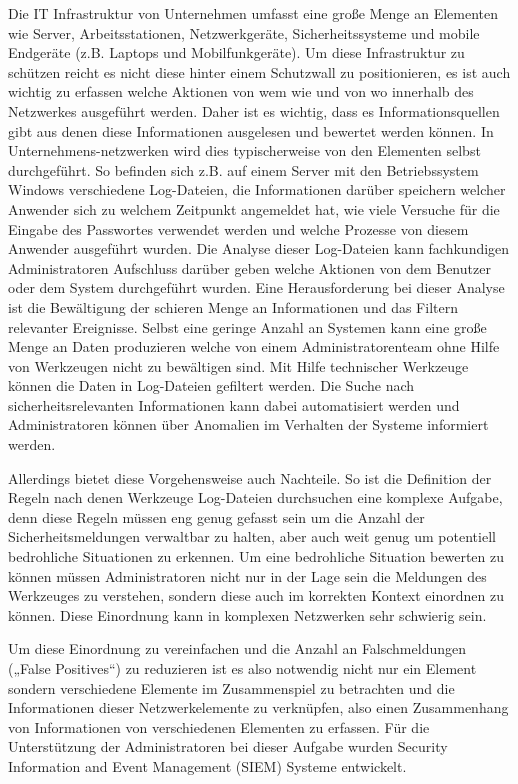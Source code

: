 Die IT Infrastruktur von Unternehmen umfasst eine große Menge an Elementen wie Server, Arbeitsstationen, Netzwerkgeräte, Sicherheitssysteme und mobile Endgeräte (z.B. Laptops und Mobilfunkgeräte). Um diese Infrastruktur zu schützen reicht es nicht diese hinter einem Schutzwall zu positionieren, es ist auch wichtig zu erfassen welche Aktionen von wem wie und von wo innerhalb des Netzwerkes ausgeführt werden. Daher ist es wichtig, dass es Informationsquellen gibt aus denen diese Informationen ausgelesen und bewertet werden können. In Unternehmens-netzwerken wird dies typischerweise von den Elementen selbst durchgeführt. So befinden sich z.B. auf einem Server mit den Betriebssystem Windows verschiedene Log-Dateien, die Informationen darüber speichern welcher Anwender sich zu welchem Zeitpunkt angemeldet hat, wie viele Versuche für die Eingabe des Passwortes verwendet werden und welche Prozesse von diesem Anwender ausgeführt wurden. 
Die Analyse dieser Log-Dateien kann fachkundigen Administratoren Aufschluss darüber geben welche Aktionen von dem Benutzer oder dem System durchgeführt wurden. Eine Herausforderung bei dieser Analyse ist die Bewältigung der schieren Menge an Informationen und das Filtern relevanter Ereignisse. Selbst eine geringe Anzahl an Systemen kann eine große Menge an Daten produzieren welche von einem Administratorenteam ohne Hilfe von Werkzeugen nicht zu bewältigen sind. Mit Hilfe technischer Werkzeuge können die Daten in Log-Dateien gefiltert werden. Die Suche nach sicherheitsrelevanten Informationen kann dabei automatisiert werden und Administratoren können über Anomalien im Verhalten der Systeme informiert werden. 

Allerdings bietet diese Vorgehensweise auch Nachteile. So ist die Definition der Regeln nach denen Werkzeuge Log-Dateien durchsuchen eine komplexe Aufgabe, denn diese Regeln müssen eng genug gefasst sein um die Anzahl der Sicherheitsmeldungen verwaltbar zu halten, aber auch weit genug um potentiell bedrohliche Situationen zu erkennen. Um eine bedrohliche Situation bewerten zu können müssen Administratoren nicht nur in der Lage sein die Meldungen des Werkzeuges zu verstehen, sondern diese auch im korrekten Kontext einordnen zu können. Diese Einordnung kann in komplexen Netzwerken sehr schwierig sein.

Um diese Einordnung zu vereinfachen und die Anzahl an Falschmeldungen („False Positives“) zu reduzieren ist es also notwendig nicht nur ein Element sondern verschiedene Elemente im Zusammenspiel zu betrachten und die Informationen dieser Netzwerkelemente zu verknüpfen, also einen Zusammenhang von Informationen von verschiedenen Elementen zu erfassen. Für die Unterstützung der Administratoren bei dieser Aufgabe wurden Security Information and Event Management (SIEM) Systeme entwickelt.


